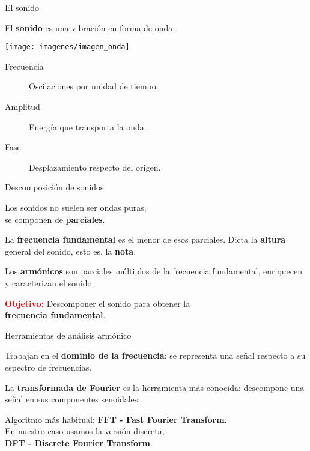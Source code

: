 \begin{frame}{El sonido}
  \begin{center}
    El \textbf{sonido} es una vibración en forma de onda.

    \bigskip
    \bigskip

    \texttt{[image: imagenes/imagen\_onda]}

    \bigskip

    \begin{description}
    \item[Frecuencia] Oscilaciones por unidad de tiempo. 
    \item[Amplitud] Energía que transporta la onda.
    \item[Fase] Desplazamiento respecto del origen.
    \end{description}
  \end{center}
\end{frame}

\begin{frame}{Descomposición de sonidos}
  \begin{center}
    Los sonidos no suelen ser ondas puras, \\se componen de \textbf{parciales}.

    \pause \bigskip
  
    La \textbf{frecuencia fundamental} es el menor de esos parciales. Dicta la
    \textbf{altura} general del sonido, esto es, la \textbf{nota}.

    \pause \bigskip

    Los \textbf{armónicos} son parciales múltiplos de la frecuencia fundamental,
    enriquecen y caracterizan el sonido. 

    \pause \bigskip
  
    {\large
    \textcolor{red}{\textbf{Objetivo:}} Descomponer el sonido para obtener la \\
    \textbf{frecuencia fundamental}.}
  \end{center}
\end{frame}

\begin{frame}{Herramientas de análisis armónico}
  \begin{center}
    Trabajan en el \textbf{dominio de la frecuencia}: se representa una señal
    respecto a su espectro de frecuencias.

    \pause \bigskip

    La \textbf{transformada de Fourier} es la herramienta más conocida:
    descompone una señal en sus componentes senoidales.

    \pause \bigskip

    Algoritmo más habitual: \textbf{FFT - Fast Fourier Transform}. \\En nuestro
    caso usamos la versión discreta, \\\textbf{DFT - Discrete Fourier Transform}.

  \end{center}
\end{frame}

